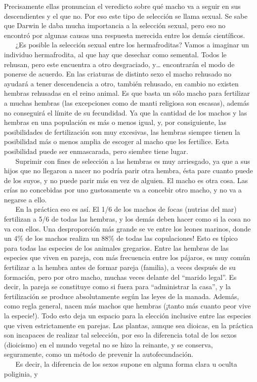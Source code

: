 Precisamente ellas pronuncian el veredicto sobre qué macho va a seguir
en sus descendientes y el que no. Por eso este tipo de selección se
llama sexual. Se sabe que Darwin le daba mucha importancia a la
selección sexual, pero eso no encontró por algunas causas una respuesta
merecida entre los demás científicos.\\
\hspace*{0.333em} ~ ~ ¿Es posible la selección sexual entre los
hermafroditas? Vamos a imaginar un individuo hermafrodita, al que hay
que desechar como semental. Todos le rehusan, pero este encuentra a otro
desgraciado, y\ldots{} encontrarán el modo de ponerse de acuerdo. En las
criaturas de distinto sexo el macho rehusado no ayudará a tener
descendencia a otro, también rehusado, en cambio no existen hembras
rehusadas en el reino animal. Es que basta un sólo macho para fertilizar
a muchas hembras (las excepciones como de manti religiosa son escasas),
además no conseguirá el límite de su fecundidad. Ya que la cantidad de
los machos y las hembras en una populación es más o menos igual, y, por
consiguiente, las posibilidades de fertilización son muy excesivas, las
hembras siempre tienen la posibilidad más o menos amplia de escoger al
macho que les fertilice. Esta posibilidad puede ser enmascarada, pero
siembre tiene lugar.\\
\hspace*{0.333em} ~ ~ Suprimir con fines de selección a las hembras es
muy arriesgado, ya que a sus hijos que no llegaron a nacer no podría
parir otra hembra, ésta pare cuanto puede de los suyos, y no puede parir
más en vez de alguien. El macho es otra cosa. Las crías no concebidas
por uno gustosamente va a concebir otro macho, y no va a negarse a
ello.\\
\hspace*{0.333em} ~ ~ En la práctica eso es así. El 1/6 de los machos de
focas (nutrias del mar) fertilizan a 5/6 de todas las hembras, y los
demás deben hacer como si la cosa no va con ellos. Una desproporción más
grande se ve entre los leones marinos, donde un 4\% de los machos
realiza un 88\% de todas las copulaciones! Esto es típico para todas las
especies de los animales gregarios. Entre las hembras de las especies
que viven en pareja, con más frecuencia entre los pájaros, es muy común
fertilizar a la hembra antes de formar pareja (familia), a veces después
de su formación, pero por otro macho, muchas veces delante del ``marido
legal''. Es decir, la pareja se constituye como si fuera para
``administrar la casa'', y la fertilización se produce absolutamente
según las leyes de la manada. Además, como regla general, nacen más
machos que hembras (¡tanto más cuanto peor vive la especie!). Todo esto
deja un espacio para la elección inclusive entre las especies que viven
estrictamente en parejas. Las plantas, aunque sea dioicas, en la
práctica son incapaces de realizar tal selección, por eso la diferencia
total de los sexos (dioicismo) en el mundo vegetal no se hizo la
reinante, y se conserva, seguramente, como un método de prevenir la
autofecundación.\\
\hspace*{0.333em} ~ ~ Es decir, la diferencia de los sexos supone en alguna forma clara u oculta poliginia, y

